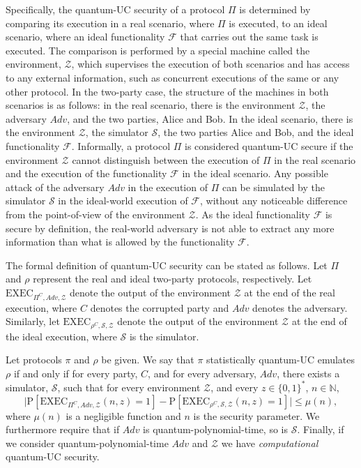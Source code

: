 Specifically, the quantum-UC security of a protocol $\Pi$ is determined by comparing its execution in a real scenario, where $\Pi$ is executed, to an ideal scenario, where an ideal functionality $\mathcal{F}$ that carries out the same task is executed. The comparison is performed by a special machine called the environment, $\mathcal{Z}$, which supervises the execution of both scenarios and has access to any external information, such as concurrent executions of the same or any other protocol. In the two-party case, the structure of the machines in both scenarios is as follows: in the real scenario, there is the environment $\mathcal{Z}$, the adversary $Adv$, and the two parties, Alice and Bob. In the ideal scenario, there is the environment $\mathcal{Z}$, the simulator $\mathcal{S}$, the two parties Alice and Bob, and the ideal functionality $\mathcal{F}$. Informally, a protocol $\Pi$ is considered quantum-UC secure if the environment $\mathcal{Z}$ cannot distinguish between the execution of $\Pi$ in the real scenario and the execution of the functionality $\mathcal{F}$ in the ideal scenario. Any possible attack of the adversary $Adv$ in the execution of $\Pi$ can be simulated by the simulator $\mathcal{S}$ in the ideal-world execution of $\mathcal{F}$, without any noticeable difference from the point-of-view of the environment $\mathcal{Z}$. As the ideal functionality $\mathcal{F}$ is secure by definition, the real-world adversary is not able to extract any more information than what is allowed by the functionality $\mathcal{F}$.

The formal definition of quantum-UC security can be stated as follows. Let $\Pi$ and $\rho$ represent the real and ideal two-party protocols, respectively. Let $\text{EXEC}_{\Pi^C, Adv, \mathcal{Z}}$ denote the output of the environment $\mathcal{Z}$ at the end of the real execution, where $C$ denotes the corrupted party and $Adv$ denotes the adversary. Similarly, let $\text{EXEC}_{\rho^C, \mathcal{S}, \mathcal{Z}}$ denote the output of the environment $\mathcal{Z}$ at the end of the ideal execution, where $\mathcal{S}$ is the simulator. 

\begin{definition}

Let protocols $\pi$ and $\rho$ be given. We say that $\pi$ statistically quantum-UC emulates $\rho$ if and only if for every party, $C$, and for every adversary, $Adv$, there exists a simulator, $\mathcal{S}$, such that for every environment $\mathcal{Z}$, and every $z\in\{0,1\}^*$, $n\in\mathbb{N}$,
\begin{equation*}
    \big|\text{P}[\text{EXEC}_{\Pi^C, Adv, \mathcal{Z}} (n, z) = 1] - \text{P}[\text{EXEC}_{\rho^C, \mathcal{S}, \mathcal{Z}}(n, z) = 1]\big| \leq \mu(n),
\end{equation*}
 where $\mu(n)$ is a negligible function and $n$ is the security parameter. We furthermore require that if $Adv$ is quantum-polynomial-time, so is $\mathcal{S}$. Finally, if we consider quantum-polynomial-time $Adv$ and $\mathcal{Z}$ we have \textit{computational} quantum-UC security.
\label{def:statisticalquc}
\end{definition}



